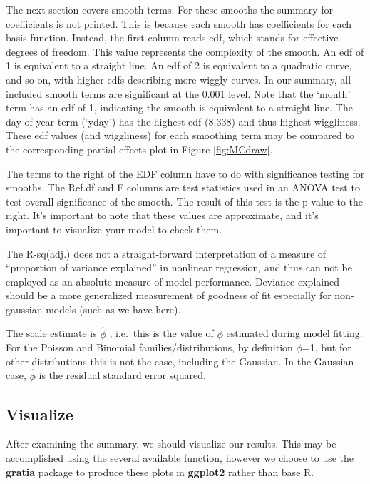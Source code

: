 \documentclass[
]{book}
\begin{document}
The next section covers smooth terms. For these smooths the summary for coefficients is not printed. This is because each smooth has coefficients for each basis function. Instead, the first column reads edf, which stands for effective degrees of freedom. This value represents the complexity of the smooth. An edf of 1 is equivalent to a straight line. An edf of 2 is equivalent to a quadratic curve, and so on, with higher edfs describing more wiggly curves. In our summary, all included smooth terms are significant at the 0.001 level. Note that the `month' term has an edf of 1, indicating the smooth is equivalent to a straight line. The day of year term (`yday') has the highest edf (8.338) and thus highest wiggliness. These edf values (and wiggliness) for each smoothing term may be compared to the corresponding partial effects plot in Figure \ref{fig:MCdraw}.

The terms to the right of the EDF column have to do with significance testing for smooths. The Ref.df and F columns are test statistics used in an ANOVA test to test overall significance of the smooth. The result of this test is the p-value to the right. It's important to note that these values are approximate, and it's important to visualize your model to check them.

The R-sq(adj.) does not a straight-forward interpretation of a measure of ``proportion of variance explained'' in nonlinear regression, and thus can not be employed as an absolute measure of model performance. Deviance explained should be a more generalized measurement of goodness of fit especially for non-gaussian models (such as we have here).

The scale estimate is \(\hat{\phi}\) , i.e.~this is the value of \(\phi\) estimated during model fitting. For the Poisson and Binomial families/distributions, by definition \(\phi\)=1, but for other distributions this is not the case, including the Gaussian. In the Gaussian case, \(\hat{\phi}\) is the residual standard error squared.

\hypertarget{visualize}{%
\subsection{Visualize}\label{visualize}}

After examining the summary, we should visualize our results. This may be accomplished using the several available function, however we choose to use the \textbf{gratia} package \citep{R-gratia} to produce these plots in \textbf{ggplot2} rather than base R.
\end{document}

